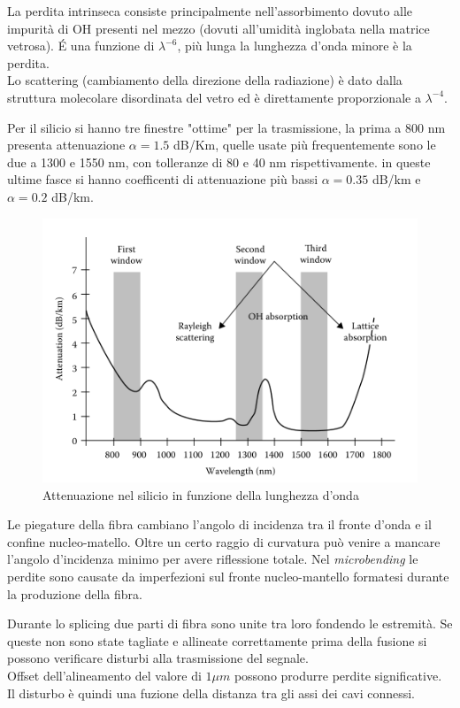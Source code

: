 \documentclass[12pt, a4paper]{article}
\begin{document}
La perdita intrinseca consiste principalmente nell'assorbimento dovuto alle impurità di OH presenti nel mezzo (dovuti all'umidità inglobata nella matrice vetrosa). É una funzione di $\lambda^{-6}$, più lunga la lunghezza d'onda minore è la perdita.\\
Lo scattering  (cambiamento della direzione della radiazione) è dato dalla struttura molecolare disordinata del vetro ed è direttamente proporzionale a $\lambda^{-4}$.

Per il silicio si hanno tre finestre "ottime" per la trasmissione, la prima a 800 nm presenta attenuazione $\alpha = 1.5$ dB/Km, quelle usate più frequentemente sono le due a 1300 e 1550 nm, con tolleranze di 80 e 40 nm rispettivamente.
in queste ultime fasce si hanno coefficenti di attenuazione più bassi $\alpha = 0.35$ dB/km e $\alpha = 0.2 $ dB/km.


\begin{figure}[h!]
\centering
\includegraphics[scale=0.7]{attenuazione.png}
\caption{Attenuazione nel silicio in funzione della lunghezza d'onda}
\end{figure}

Le piegature della fibra cambiano l'angolo di incidenza tra il fronte d'onda e il confine nucleo-matello. Oltre un certo raggio di curvatura può venire a mancare l'angolo d'incidenza minimo per avere riflessione totale.
Nel \textit{microbending} le perdite sono causate da imperfezioni sul fronte nucleo-mantello formatesi durante la produzione della fibra.

\vspace{5mm}
Durante lo splicing due parti di fibra sono unite tra loro fondendo le estremità. Se queste non sono state tagliate e allineate correttamente prima della fusione si possono verificare disturbi alla trasmissione del segnale.\\
Offset dell'alineamento del valore di $1\mu m$ possono produrre perdite significative. Il disturbo è quindi una fuzione della distanza tra gli assi dei cavi connessi.
\end{document}
